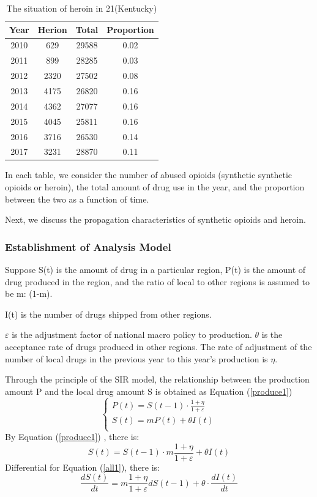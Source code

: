 \documentclass[12pt]{mcmthesis}
\begin{document}
\begin{table}[htb]
\centering
\caption{The situation of heroin in 21(Kentucky)}\label{21state}
\begin{tabular}{|c|c|c|c|}
\hline
Year & Herion& Total&Proportion \\\hline
2010 & 629  & 29588 & 0.02 \\
2011 & 899  & 28285 & 0.03 \\
2012 & 2320 & 27502 & 0.08 \\
2013 & 4175 & 26820 & 0.16 \\
2014 & 4362 & 27077 & 0.16 \\
2015 & 4045 & 25811 & 0.16 \\
2016 & 3716 & 26530 & 0.14 \\
2017 & 3231 & 28870 & 0.11 \\\hline
\end{tabular}
\end{table}
In each table, we consider the number of abused opioids (synthetic synthetic opioids or heroin), the total amount of drug use in the year, and the proportion between the two as a function of time.
\par Next, we discuss the propagation characteristics of synthetic opioids and heroin.
\subsubsection{Establishment of Analysis Model}
 Suppose S(t) is the amount of drug in a particular region, P(t) is the amount of drug produced in the region, and the ratio of local to other regions is assumed to be m: (1-m).\par I(t) is the number of drugs shipped from other regions.\par $\varepsilon$ is the adjustment factor of national macro policy to production.
$\theta$ is the acceptance rate of drugs produced in other regions.
The rate of adjustment of the number of local drugs in the previous year to this year's production is $\eta$.\par
Through the principle of the SIR model\cite{computer virus}, the relationship between the production amount P and the local drug amount S is obtained as Equation (\ref{produce1})
\begin{equation}\label{produce1}
\left\{
\begin{array}{c}
  P(t)=S(t-1)\cdot\frac{1+\eta}{1+\varepsilon}\\
  S(t)=mP(t)+\theta I(t)\\
  \end{array}
  \right.
\end{equation}
By Equation (\ref{produce1}) , there is:
\begin{equation}\label{all1}
  S(t)=S(t-1)\cdot m \frac{1+\eta}{1+\varepsilon}+\theta I(t)
\end{equation}
Differential for Equation (\ref{all1}), there is:
\begin{equation}\label{all2}
\frac{dS(t)}{dt}=m\frac{1+\eta}{1+\varepsilon} dS(t-1)+\theta\cdot \frac{dI(t)}{dt}
\end{equation}
\end{document}
